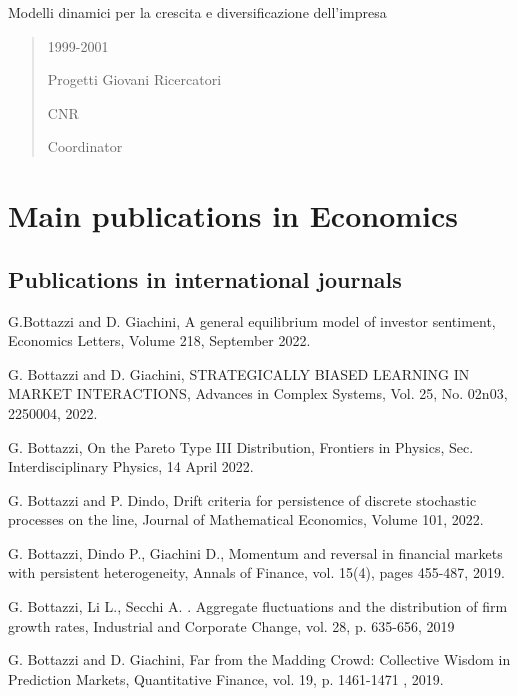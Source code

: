 \documentclass[a4paper]{article}
\newenvironment{DUfieldlist}%
    {\quote\description}
    {\enddescription\endquote}
\begin{document}
Modelli dinamici per la crescita e diversificazione dell'impresa

\begin{quote}
\begin{DUfieldlist}
\item[{period:}]
1999-2001

\item[{type:}]
Progetti Giovani Ricercatori

\item[{sponsor:}]
CNR

\item[{role:}]
Coordinator
\end{DUfieldlist}
\end{quote}


\section{Main publications in Economics%
  \label{main-publications-in-economics}%
}


\subsection{Publications in international journals%
  \label{publications-in-international-journals}%
}

G.Bottazzi and D. Giachini, A general equilibrium model of investor
sentiment, Economics Letters, Volume 218, September 2022.

G. Bottazzi and D. Giachini, STRATEGICALLY BIASED LEARNING IN MARKET
INTERACTIONS, Advances in Complex Systems, Vol. 25, No. 02n03,
2250004, 2022.

G. Bottazzi, On the Pareto Type III Distribution, Frontiers in
Physics, Sec. Interdisciplinary Physics, 14 April 2022.

G. Bottazzi and P. Dindo, Drift criteria for persistence of discrete
stochastic processes on the line, Journal of Mathematical Economics,
Volume 101, 2022.

G. Bottazzi, Dindo P., Giachini D., Momentum and reversal in financial
markets with persistent heterogeneity, Annals of Finance, vol. 15(4),
pages 455-487, 2019.

G. Bottazzi, Li L., Secchi A. . Aggregate fluctuations and the
distribution of firm growth rates, Industrial and Corporate Change,
vol. 28, p. 635-656, 2019

G. Bottazzi and D. Giachini, Far from the Madding Crowd: Collective
Wisdom in Prediction Markets, Quantitative Finance,
vol. 19, p. 1461-1471 , 2019.
\end{document}
